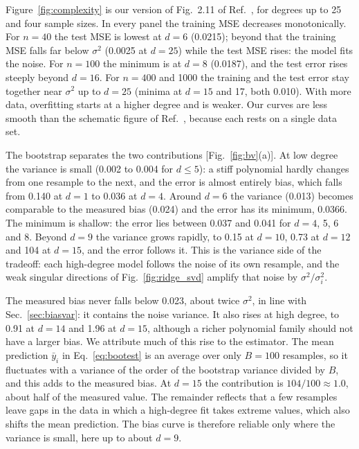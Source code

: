 \documentclass[aps,reprint,amsmath,amssymb,nofootinbib,floatfix]{revtex4-2}
\begin{document}
Figure~\ref{fig:complexity} is our version of Fig.~2.11 of Ref.~\cite{hastie2009}, for degrees up
to 25 and four sample sizes. In every panel the training MSE decreases monotonically. For $n=40$
the test MSE is lowest at $d=6$ (0.0215); beyond that the training MSE falls far below $\sigma^2$
(0.0025 at $d=25$) while the test MSE rises: the model fits the noise. For $n=100$ the minimum is
at $d=8$ (0.0187), and the test error rises steeply beyond $d=16$. For $n=400$ and 1000 the
training and the test error stay together near $\sigma^2$ up to $d=25$ (minima at $d=15$ and 17,
both 0.010). With more data, overfitting starts at a higher degree and is weaker. Our curves are
less smooth than the schematic figure of Ref.~\cite{hastie2009}, because each rests on a single
data set.

The bootstrap separates the two contributions [Fig.~\ref{fig:bv}(a)]. At low degree the variance is
small (0.002 to 0.004 for $d\le5$): a stiff polynomial hardly changes from one resample to the
next, and the error is almost entirely bias, which falls from 0.140 at $d=1$ to 0.036 at $d=4$.
Around $d=6$ the variance (0.013) becomes comparable to the measured bias (0.024) and the error
has its minimum, 0.0366. The minimum is shallow: the error lies between 0.037 and 0.041 for
$d=4$, 5, 6 and 8. Beyond $d=9$ the variance grows rapidly, to 0.15 at $d=10$, 0.73 at $d=12$ and
104 at $d=15$, and the error follows it. This is the variance side of the tradeoff: each
high-degree model follows the noise of its own resample, and the weak singular directions of
Fig.~\ref{fig:ridge_svd} amplify that noise by $\sigma^2/\sigma_i^2$.

The measured bias never falls below 0.023, about twice $\sigma^2$, in line with
Sec.~\ref{sec:biasvar}: it contains the noise variance. It also rises at high degree, to 0.91 at
$d=14$ and 1.96 at $d=15$, although a richer polynomial family should not have a larger bias. We
attribute much of this rise to the estimator. The mean prediction $\bar y_i$ in
Eq.~\eqref{eq:bootest} is an average over only $B=100$ resamples, so it fluctuates with a variance
of the order of the bootstrap variance divided by $B$, and this adds to the measured bias. At
$d=15$ the contribution is $104/100\approx1.0$, about half of the measured value. The remainder
reflects that a few resamples leave gaps in the data in which a high-degree fit takes extreme
values, which also shifts the mean prediction. The bias curve is therefore reliable only where the
variance is small, here up to about $d=9$.
\end{document}
